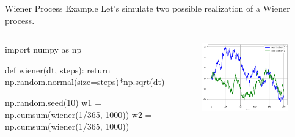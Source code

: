 \documentclass{beamer}
\begin{document}
\begin{frame}[fragile]{Wiener Process Example}
  Let's simulate two possible realization of a Wiener process.
  \begin{columns}
  \begin{ipython}
import numpy as np

def wiener(dt, steps):
    return np.random.normal(size=steps)*np.sqrt(dt)

np.random.seed(10)
w1 = np.cumsum(wiener(1/365, 1000))
w2 = np.cumsum(wiener(1/365, 1000))
\end{ipython}
  \begin{figure}[h]
    \begin{center}
      \includegraphics[width=0.90\linewidth]{wiener}
    \end{center}
  \end{figure}
  \end{columns}
\end{frame}
\end{document}
